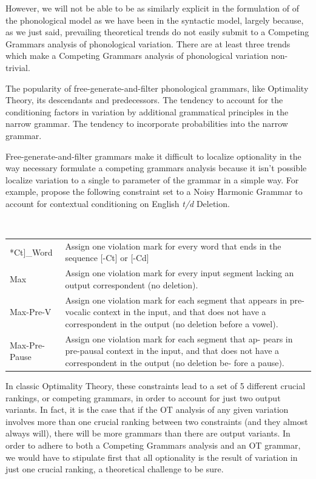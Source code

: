 However, we will not be able to be as similarly explicit in the formulation of of the phonological model as we have been in the syntactic model, largely because, as we just said, prevailing theoretical trends do not easily submit to a Competing Grammars analysis of phonological variation.
There are at least three trends which make a Competing Grammars analysis of phonological variation non-trivial.
\begin{exe}
	\ex \label{ot-tend}
		 The popularity of free-generate-and-filter phonological grammars, like Optimality Theory, its descendants and predecessors.
	\ex \label{gram-tend}
		The tendency to account for the conditioning factors in variation by additional grammatical principles in the narrow grammar.
	\ex \label{prob-tend}
		The tendency to incorporate probabilities into the narrow grammar.
\end{exe}

Free-generate-and-filter grammars make it difficult to localize optionality in the way necessary formulate a competing grammars analysis because it isn't possible localize variation to a single to parameter of the grammar in a simple way.
For example, \citet{Coetzee2012} propose the following constraint set to a Noisy Harmonic Grammar to account for contextual conditioning on English {\it t/d} Deletion.
\begin{exe}
	\ex \label{noisy.hg}\  \\
\begin{tabular}{lp{3in}}
	*{\sc Ct}]_{Word}& Assign one violation mark for every word that ends in the sequence [-Ct] or [-Cd]\\
	{\sc Max} & Assign one violation mark for every input segment lacking an output correspondent (no deletion).\\
	{\sc Max-Pre-V} & Assign one violation mark for each segment that appears in pre-vocalic context in the input, and that does not have a correspondent in the output (no deletion before a vowel).\\
	{\sc Max-Pre-Pause} &Assign one violation mark for each segment that ap- pears in pre-pausal context in the input, and that does not have a correspondent in the output (no deletion be- fore a pause).
\end{tabular}
\end{exe}
In classic Optimality Theory, these constraints lead to a set of 5 different crucial rankings, or competing grammars, in order to account for just two output variants.
In fact, it is the case that if the OT analysis of any given variation involves more than one crucial ranking between two constraints (and they almost always will), there will be more grammars than there are output variants.
In order to adhere to both a Competing Grammars analysis and an OT grammar, we would have to stipulate first that all optionality is the result of variation in just one crucial ranking, a theoretical challenge to be sure.

